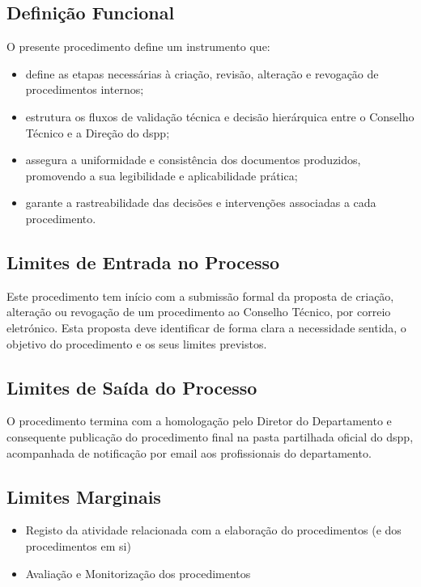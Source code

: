     \subsection{Definição Funcional}\label{subsec:definicao-funcional}

    O presente procedimento define um instrumento que:
    \begin{itemize}
        \item define as etapas necessárias à criação, revisão, alteração e revogação de procedimentos internos;
        \item estrutura os fluxos de validação técnica e decisão hierárquica entre o Conselho Técnico e a Direção do \gls{dspp};
        \item assegura a uniformidade e consistência dos documentos produzidos, promovendo a sua legibilidade e aplicabilidade prática;
        \item garante a rastreabilidade das decisões e intervenções associadas a cada procedimento.
    \end{itemize}
    
    \subsection{Limites de Entrada no Processo}\label{subsec:limites-de-entrada-no-processo}

    Este procedimento tem início com a submissão formal da proposta de criação, alteração ou revogação de um procedimento ao Conselho Técnico, por correio eletrónico. Esta proposta deve identificar de forma clara a necessidade sentida, o objetivo do procedimento e os seus limites previstos.

    \subsection{Limites de Saída do Processo}\label{subsec:limites-de-saida-do-processo}

    O procedimento termina com a homologação pelo Diretor do Departamento e consequente publicação do procedimento final na pasta partilhada oficial do \gls{dspp}, acompanhada de notificação por email aos profissionais do departamento.

    \subsection{Limites Marginais}\label{subsec:limites-marginais}

    \begin{itemize}
        \item Registo da atividade relacionada com a elaboração do procedimentos (e dos procedimentos em si)
        \item Avaliação e Monitorização dos procedimentos
    \end{itemize}


